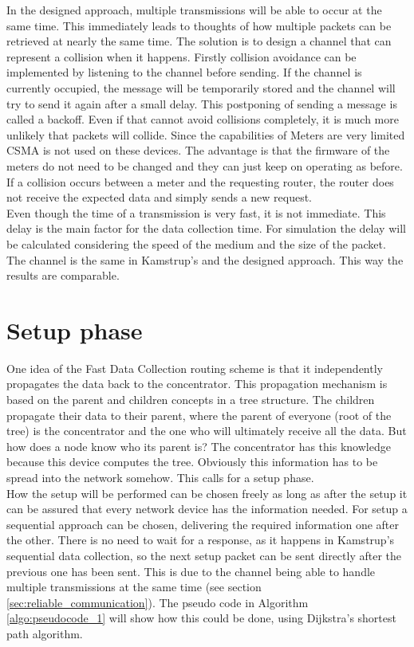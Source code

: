 In the designed approach, multiple transmissions will be able to occur at the same time. This immediately leads to thoughts of how multiple packets can be retrieved at nearly the same time. The solution is to design a channel that can represent a collision when it happens. Firstly collision avoidance can be implemented by listening to the channel before sending. If the channel is currently occupied, the message will be temporarily stored and the channel will try to send it again after a small delay. This postponing of sending a message is called a backoff. Even if that cannot avoid collisions completely, it is much more unlikely that packets will collide. Since the capabilities of Meters are very limited CSMA is not used on these devices. The advantage is that the firmware of the meters do not need to be changed and they can just keep on operating as before. If a collision occurs between a meter and the requesting router, the router does not receive the expected data and simply sends a new request.\\
Even though the time of a transmission is very fast, it is not immediate. This delay is the main factor for the data collection time. For simulation the delay will be calculated considering the speed of the medium and the size of the packet. The channel is the same in Kamstrup's and the designed approach. This way the results are comparable.

\section{Setup phase}
One idea of the Fast Data Collection routing scheme is that it independently propagates the data back to the concentrator. This propagation mechanism is based on the parent and children concepts in a tree structure. The children propagate their data to their parent, where the parent of everyone (root of the tree) is the concentrator and the one who will ultimately receive all the data. But how does a node know who its parent is? The concentrator has this knowledge because this device computes the tree. Obviously this information has to be spread into the network somehow. This calls for a setup phase.\\
How the setup will be performed can be chosen freely as long as after the setup it can be assured that every network device has the information needed. For setup a sequential approach can be chosen, delivering the required information one after the other. There is no need to wait for a response, as it happens in Kamstrup's sequential data collection, so the next setup packet can be sent directly after the previous one has been sent. This is due to the channel being able to handle multiple transmissions at the same time (see section \ref{sec:reliable_communication}). The pseudo code in Algorithm \ref{algo:pseudocode_1} will show how this could be done, using Dijkstra's shortest path algorithm.

